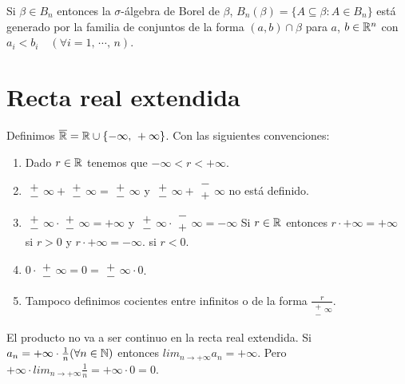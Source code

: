 \begin{eg}
    Si $\beta \in B_n$ entonces la $\sigma$-álgebra de Borel de $\beta$, $B_n(\beta) = \{ A \subseteq \beta : A \in B_n \}$ está generado por la familia de conjuntos
    de la forma $(a, b) \cap \beta$ para $a$, $b \in \mathbb{R}^n$ con $a_i < b_i \quad (\forall i = 1 \text{, } \cdots \text{, } n)$.
\end{eg}

\section{Recta real extendida}

\begin{definition}
    Definimos $\overline{\mathbb{R}} = \mathbb{R} \cup \{ -\infty\text{, } +\infty \}$. Con las siguientes convenciones:
    \begin{enumerate}
        \item Dado $r \in \mathbb{R}$ tenemos que $-\infty < r < +\infty$.
        \item $\substack{+ \\ -} \infty + \substack{+ \\ -} \infty = \substack{+ \\ -} \infty$ y
              $\substack{+ \\ -} \infty + \substack{- \\ +} \infty$ no está definido.
        \item $\substack{+ \\ -} \infty \cdot \substack{+ \\ -} \infty = +\infty$ y
              $\substack{+ \\ -} \infty \cdot \substack{- \\ +} \infty = -\infty$
              Si $r \in \mathbb{R}$ entonces $r \cdot +\infty = +\infty$ si $r > 0$ y $r \cdot +\infty = -\infty$. si $r < 0$.
        \item $0 \cdot \substack{+ \\ -} \infty = 0 = \substack{+ \\ -} \infty \cdot 0$.
        \item Tampoco definimos cocientes entre infinitos o de la forma $\frac{r}{\substack{+ \\ -} \infty}$.
    \end{enumerate}
\end{definition}

\begin{note}
    El producto no va a ser continuo en la recta real extendida.
    Si $a_n = +\infty \cdot \frac{1}{n} (\forall n \in \mathbb{N})$ entonces $lim_{n \to +\infty} a_n = +\infty$. Pero $+\infty \cdot lim_{n \to +\infty} \frac{1}{n} = +\infty \cdot 0 = 0$.
\end{note}

